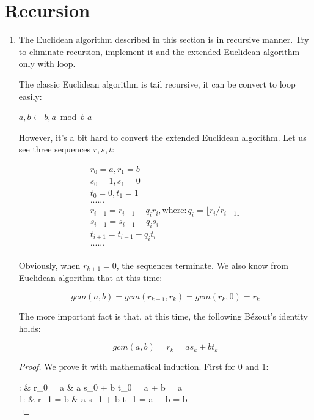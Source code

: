 \documentclass[UTF8]{article}
\begin{document}
\section{Recursion}

\begin{enumerate}
\item {The Euclidean algorithm described in this section is in recursive manner. Try to eliminate recursion, implement it and the extended Euclidean algorithm only with loop.}

The classic Euclidean algorithm is tail recursive, it can be convert to loop easily:

\begin{algorithmic}
  \State $a, b \gets b, a \bmod b$
\EndWhile
\State \Return $a$
\EndFunction
\end{algorithmic}

However, it's a bit hard to convert the extended Euclidean algorithm. Let us see three sequences $r, s, t$:

\[\begin{array}{l}
r_0 = a, r_1 = b \\
s_0 = 1, s_1 = 0 \\
t_0 = 0, t_1 = 1 \\
 ...  ... \\
r_{i+1} = r_{i-1} - q_{i} r_{i}, \text{where}: q_{i} = \lfloor r_{i} / r_{i-1} \rfloor \\
s_{i+1} = s_{i-1} - q_{i} s_{i} \\
t_{i+1} = t_{i-1} - q_{i} t_{i} \\
... ...\\
\end{array}\]

Obviously, when $r_{k+1} = 0$, the sequences terminate. We also know from Euclidean algorithm that at this time:

\[
gcm(a, b) = gcm(r_{k-1}, r_{k}) = gcm(r_k, 0) = r_{k}
\]

The more important fact is that, at this time, the following Bézout's identity holds:

\[
gcm(a, b) = r_{k} = a s_{k} + b t_{k}
\]

\begin{proof}
We prove it with mathematical induction. First for 0 and 1:

: & r_0 = a & a s_0 + b t_0 = a  + b  = a \\
1: & r_1 = b & a s_1 + b t_1 = a  + b  = b \\
\elre


\end{proof}
\end{enumerate}
\end{document}
